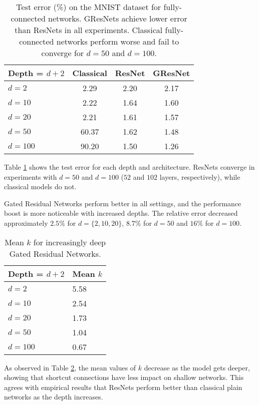 \documentclass{article} %
\begin{document}
\begin{table}[h!]
\centering
    \begin{tabular}{ | l | c | c | c |}
    \hline
    Depth = $d+2$ & Classical & ResNet & GResNet \\ \hline
    $d=2$  & 			2.29 & 	2.20 & 	2.17 \\ \hline
    $d=10$ & 			2.22 & 	1.64 & 	1.60 \\ \hline
    $d=20$ & 			2.21 & 	1.61 & 	1.57 \\ \hline
    $d=50$ & 			60.37 & 	1.62 & 	1.48 	\\ \hline
    $d=100$ &		90.20 & 	1.50 & 	1.26 	\\ \hline
    \end{tabular}
\caption{Test error (\%) on the MNIST dataset for fully-connected networks. GResNets achieve lower error than ResNets in all experiments. Classical fully-connected networks perform worse and fail to converge for $d = 50$ and $d = 100$.}
    \label{mnist_table}   
\end{table}

Table \ref{mnist_table} shows the test error for each depth and architecture. ResNets converge in experiments with $d = 50$ and $d = 100$ ($52$ and $102$ layers, respectively), while classical models do not. 

Gated Residual Networks perform better in all settings, and the performance boost is more noticeable with increased depths. The relative error decreased approximately $2.5 \%$ for $d = \{2,10,20\}$, $8.7 \%$ for $d=50$ and $16\%$ for $d = 100$.

\begin{table}[h!]
\centering
    \begin{tabular}{ | l | l |}
    \hline
    Depth = $d+2$ & Mean $k$ \\ \hline
    $d=2 $ & 			5.58 	\\ \hline
    $d=10$ & 			2.54	\\ \hline
    $d=20$ & 			1.73	\\ \hline
    $d=50$ & 			1.04 	\\ \hline
    $d=100$ & 			0.67 	\\ \hline
    \end{tabular}
\caption{Mean $k$ for increasingly deep Gated Residual Networks.}
    \label{mnist_k}   
\end{table}

As observed in Table \ref{mnist_k}, the mean values of $k$ decrease as the model gets deeper, showing that shortcut connections have less impact on shallow networks. This agrees with empirical results that ResNets perform better than classical plain networks as the depth increases.
\end{document}
